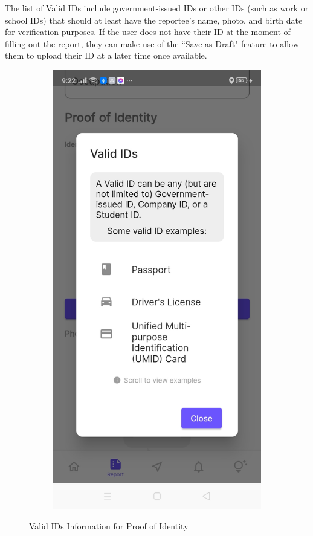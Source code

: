 The list of Valid IDs include government-issued IDs or other IDs (such as work or school IDs) that should at least have the reportee's name, photo, and birth date for verification purposes. If the user does not have their ID at the moment of filling out the report, they can make use of the ``Save as Draft" feature to allow them to upload their ID at a later time once available.
\begin{figure}[!h]
    \centering
    \begin{subfigure}[c]{0.40\linewidth}
        \centering
        \includegraphics[scale=0.15]{figures/Chapter4/Main/validID.jpg}
    \end{subfigure}
    \caption{Valid IDs Information for Proof of Identity}
    \label{fig:validIDs}
\end{figure}

